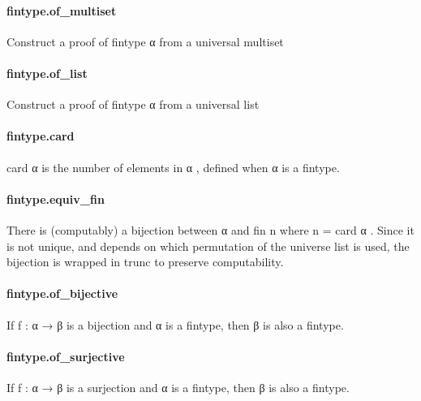 \documentclass{article}
\begin{document}
\paragraph{fintype.of\_multiset}
\par
Construct a proof of 
\colorbox[RGB]{253,246,227}{{{{\color[RGB]{101, 123, 131} fintype α }}}} from a universal multiset
\paragraph{fintype.of\_list}
\par
Construct a proof of 
\colorbox[RGB]{253,246,227}{{{{\color[RGB]{101, 123, 131} fintype α }}}} from a universal list
\paragraph{fintype.card}
\par
\colorbox[RGB]{253,246,227}{{{{\color[RGB]{101, 123, 131} card α }}}} is the number of elements in 
\colorbox[RGB]{253,246,227}{{{{\color[RGB]{101, 123, 131} α }}}}, defined when 
\colorbox[RGB]{253,246,227}{{{{\color[RGB]{101, 123, 131} α }}}} is a fintype.
\paragraph{fintype.equiv\_fin}
\par
There is (computably) a bijection between 
\colorbox[RGB]{253,246,227}{{{{\color[RGB]{101, 123, 131} α }}}} and 
\colorbox[RGB]{253,246,227}{{{{\color[RGB]{101, 123, 131} fin n }}}} where
\colorbox[RGB]{253,246,227}{{{{\color[RGB]{101, 123, 131} n  }}}{{{\color[RGB]{181, 137, 0} = }}}{{{\color[RGB]{101, 123, 131}  card α }}}}. Since it is not unique, and depends on which permutation
of the universe list is used, the bijection is wrapped in 
\colorbox[RGB]{253,246,227}{{{{\color[RGB]{101, 123, 131} trunc }}}} to
preserve computability.
\paragraph{fintype.of\_bijective}
\par
If 
\colorbox[RGB]{253,246,227}{{{{\color[RGB]{101, 123, 131} f : α  }}}{{{\color[RGB]{133, 153, 0} → }}}{{{\color[RGB]{101, 123, 131}  β }}}} is a bijection and 
\colorbox[RGB]{253,246,227}{{{{\color[RGB]{101, 123, 131} α }}}} is a fintype, then 
\colorbox[RGB]{253,246,227}{{{{\color[RGB]{101, 123, 131} β }}}} is also a fintype.
\paragraph{fintype.of\_surjective}
\par
If 
\colorbox[RGB]{253,246,227}{{{{\color[RGB]{101, 123, 131} f : α  }}}{{{\color[RGB]{133, 153, 0} → }}}{{{\color[RGB]{101, 123, 131}  β }}}} is a surjection and 
\colorbox[RGB]{253,246,227}{{{{\color[RGB]{101, 123, 131} α }}}} is a fintype, then 
\colorbox[RGB]{253,246,227}{{{{\color[RGB]{101, 123, 131} β }}}} is also a fintype.
\end{document}
